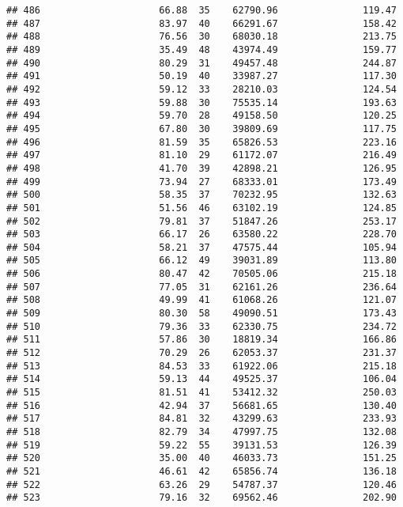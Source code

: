 \documentclass[
]{article}
\begin{document}
\begin{verbatim}
## 486                     66.88  35    62790.96               119.47
## 487                     83.97  40    66291.67               158.42
## 488                     76.56  30    68030.18               213.75
## 489                     35.49  48    43974.49               159.77
## 490                     80.29  31    49457.48               244.87
## 491                     50.19  40    33987.27               117.30
## 492                     59.12  33    28210.03               124.54
## 493                     59.88  30    75535.14               193.63
## 494                     59.70  28    49158.50               120.25
## 495                     67.80  30    39809.69               117.75
## 496                     81.59  35    65826.53               223.16
## 497                     81.10  29    61172.07               216.49
## 498                     41.70  39    42898.21               126.95
## 499                     73.94  27    68333.01               173.49
## 500                     58.35  37    70232.95               132.63
## 501                     51.56  46    63102.19               124.85
## 502                     79.81  37    51847.26               253.17
## 503                     66.17  26    63580.22               228.70
## 504                     58.21  37    47575.44               105.94
## 505                     66.12  49    39031.89               113.80
## 506                     80.47  42    70505.06               215.18
## 507                     77.05  31    62161.26               236.64
## 508                     49.99  41    61068.26               121.07
## 509                     80.30  58    49090.51               173.43
## 510                     79.36  33    62330.75               234.72
## 511                     57.86  30    18819.34               166.86
## 512                     70.29  26    62053.37               231.37
## 513                     84.53  33    61922.06               215.18
## 514                     59.13  44    49525.37               106.04
## 515                     81.51  41    53412.32               250.03
## 516                     42.94  37    56681.65               130.40
## 517                     84.81  32    43299.63               233.93
## 518                     82.79  34    47997.75               132.08
## 519                     59.22  55    39131.53               126.39
## 520                     35.00  40    46033.73               151.25
## 521                     46.61  42    65856.74               136.18
## 522                     63.26  29    54787.37               120.46
## 523                     79.16  32    69562.46               202.90

\end{verbatim}
\end{document}
